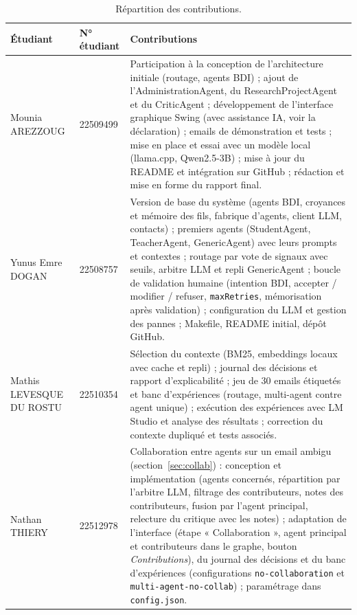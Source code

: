 \documentclass[11pt,a4paper]{article}
\newcommand{\code}[1]{\texttt{#1}}
\begin{document}
\begin{table}[H]
\centering
\small
\begin{tabularx}{\linewidth}{l l L}
\toprule
\textbf{Étudiant} & \textbf{N° étudiant} & \textbf{Contributions} \\
\midrule
Mounia AREZZOUG & 22509499 &
Participation à la conception de l'architecture initiale (routage, agents BDI) ;
ajout de l'AdministrationAgent, du ResearchProjectAgent et du CriticAgent ;
développement de l'interface graphique Swing (avec assistance IA, voir la déclaration) ;
emails de démonstration et tests ; mise en place et essai avec un modèle local
(llama.cpp, Qwen2.5-3B) ; mise à jour du README et intégration sur GitHub ;
rédaction et mise en forme du rapport final. \\
\addlinespace
Yunus Emre DOGAN & 22508757 &
Version de base du système (agents BDI, croyances et mémoire des fils,
fabrique d'agents, client LLM, contacts) ; premiers agents (StudentAgent,
TeacherAgent, GenericAgent) avec leurs prompts et contextes ; routage par vote
de signaux avec seuils, arbitre LLM et repli GenericAgent ; boucle de
validation humaine (intention BDI, accepter / modifier / refuser,
\texttt{maxRetries}, mémorisation après validation) ; configuration du LLM et
gestion des pannes ; Makefile, README initial, dépôt GitHub. \\
\addlinespace
Mathis LEVESQUE DU ROSTU & 22510354 &
Sélection du contexte (BM25, embeddings locaux avec cache et repli) ; journal des
décisions et rapport d'explicabilité ; jeu de 30 emails étiquetés et banc d'expériences
(routage, multi-agent contre agent unique) ; exécution des expériences avec LM Studio et
analyse des résultats ; correction du contexte dupliqué et tests associés. \\
\addlinespace
Nathan THIERY & 22512978 &
Collaboration entre agents sur un email ambigu (section~\ref{sec:collab}) : conception et
implémentation (agents concernés, répartition par l'arbitre LLM, filtrage des
contributeurs, notes des contributeurs, fusion par l'agent principal, relecture du critique
avec les notes) ; adaptation de l'interface (étape « Collaboration », agent principal et
contributeurs dans le graphe, bouton \emph{Contributions}), du journal des décisions et du
banc d'expériences (configurations \code{no-collaboration} et \code{multi-agent-no-collab}) ;
paramétrage dans \code{config.json}.\\
\bottomrule
\end{tabularx}
\caption{Répartition des contributions.}
\end{table}
\end{document}
